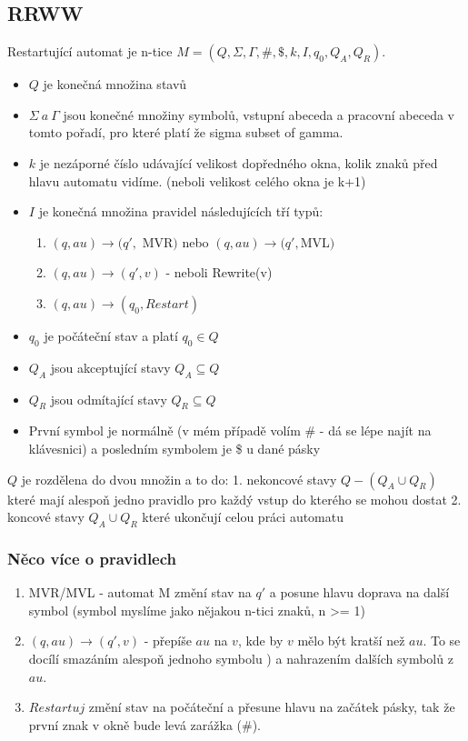 \documentclass{article}
\begin{document}
\subsection{RRWW}
Restartující automat je n-tice $M =  (Q ,\Sigma, \Gamma, \# , \$, k ,I ,q_0, Q_A, Q_R)$.
\begin{itemize}
	\item  $Q$ je konečná množina stavů
	\item  $\Sigma  \ a \ \Gamma$ jsou konečné množiny symbolů,
		vstupní abeceda a pracovní abeceda v tomto pořadí, pro které platí že sigma subset of gamma.
	\item  $k$ je nezáporné číslo udávající velikost dopředného okna,
		kolik znaků před hlavu automatu vidíme. (neboli velikost celého okna je k+1)
	\item  $I$ je konečná množina pravidel následujících tří typů:
		\begin{enumerate}
			\item $(q, au) \to (q',$ MVR$)$ nebo $(q, au) \to (q', $MVL$)$
			\item $(q, au)\to(q', v)$	- neboli Rewrite(v)
			\item $(q, au) \to (q_0, Restart)$
		\end{enumerate}
	\item  $q_0$ je počáteční stav a platí $q_0 \in Q$
	\item  $Q_A$ jsou akceptující stavy $Q_A \subseteq Q$
	\item  $Q_R$ jsou odmítající stavy $Q_R \subseteq Q$
	\item  První symbol je normálně \cent (v mém případě volím \# - dá se lépe najít na klávesnici) a posledním symbolem je \$ u dané pásky
\end{itemize}

$Q$ je rozdělena do dvou množin a to do:
1. nekoncové stavy $Q - (Q_A \cup Q_R)$ které mají alespoň jedno pravidlo pro každý vstup do kterého se mohou dostat
2. koncové stavy $Q_A \cup Q_R$ které ukončují celou práci automatu

\subsubsection{Něco více o pravidlech}
\begin{enumerate}
	\item MVR/MVL - automat M změní stav na $q'$ a posune hlavu doprava na další symbol (symbol myslíme jako nějakou n-tici znaků, n >= 1)
	\item $(q, au)\to(q', v)$ - přepíše $au$ na $v$, kde by $v$ mělo být kratší než $au$.
	To se docílí smazáním alespoň jednoho symbolu ) a nahrazením dalších symbolů z $au$.
	\item  $Restartuj$ změní stav na počáteční a přesune hlavu na začátek pásky, tak že první znak v okně bude levá zarážka (\#).
\end{enumerate}
\end{document}
